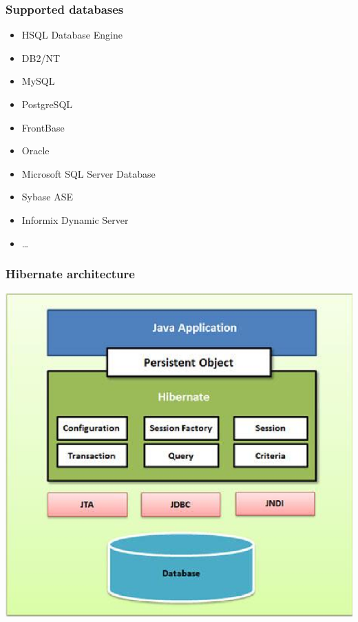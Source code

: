 \documentclass[10pt,xcolor=pdflatex]{beamer}
\begin{document}
\begin{frame}\frametitle{Supported databases}
	\begin{itemize}
		\item HSQL Database Engine
		\item DB2/NT
		\item MySQL
		\item PostgreSQL
		\item FrontBase
		\item Oracle
		\item Microsoft SQL Server Database
		\item Sybase ASE
		\item Informix Dynamic Server
		\item \ldots
	\end{itemize}
\end{frame}


\begin{frame}\frametitle{Hibernate architecture}
	\centering\includegraphics[width=0.7\paperwidth]{img/pic6.png}
\end{frame}
\end{document}
